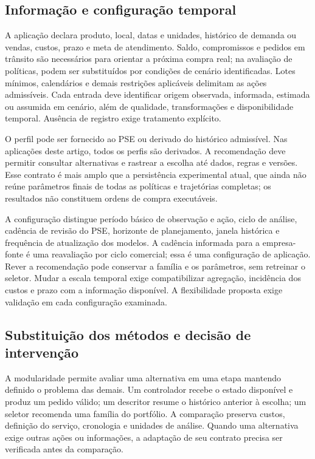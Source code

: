 \documentclass[preprint,12pt]{elsarticle}
\begin{document}
\subsection{Informação e configuração temporal}
A aplicação declara produto, local, datas e unidades, histórico de demanda ou vendas, custos, prazo e meta de atendimento. Saldo, compromissos e pedidos em trânsito são necessários para orientar a próxima compra real; na avaliação de políticas, podem ser substituídos por condições de cenário identificadas. Lotes mínimos, calendários e demais restrições aplicáveis delimitam as ações admissíveis. Cada entrada deve identificar origem observada, informada, estimada ou assumida em cenário, além de qualidade, transformações e disponibilidade temporal. Ausência de registro exige tratamento explícito.

O perfil pode ser fornecido ao PSE ou derivado do histórico admissível. Nas aplicações deste artigo, todos os perfis são derivados. A recomendação deve permitir consultar alternativas e rastrear a escolha até dados, regras e versões. Esse contrato é mais amplo que a persistência experimental atual, que ainda não reúne parâmetros finais de todas as políticas e trajetórias completas; os resultados não constituem ordens de compra executáveis.

A configuração distingue período básico de observação e ação, ciclo de análise, cadência de revisão do PSE, horizonte de planejamento, janela histórica e frequência de atualização dos modelos. A cadência informada para a empresa-fonte é uma reavaliação por ciclo comercial; essa é uma configuração de aplicação. Rever a recomendação pode conservar a família e os parâmetros, sem retreinar o seletor. Mudar a escala temporal exige compatibilizar agregação, incidência dos custos e prazo com a informação disponível. A flexibilidade proposta exige validação em cada configuração examinada.

\subsection{Substituição dos métodos e decisão de intervenção}
A modularidade permite avaliar uma alternativa em uma etapa mantendo definido o problema das demais. Um controlador recebe o estado disponível e produz um pedido válido; um descritor resume o histórico anterior à escolha; um seletor recomenda uma família do portfólio. A comparação preserva custos, definição do serviço, cronologia e unidades de análise. Quando uma alternativa exige outras ações ou informações, a adaptação de seu contrato precisa ser verificada antes da comparação.
\end{document}
